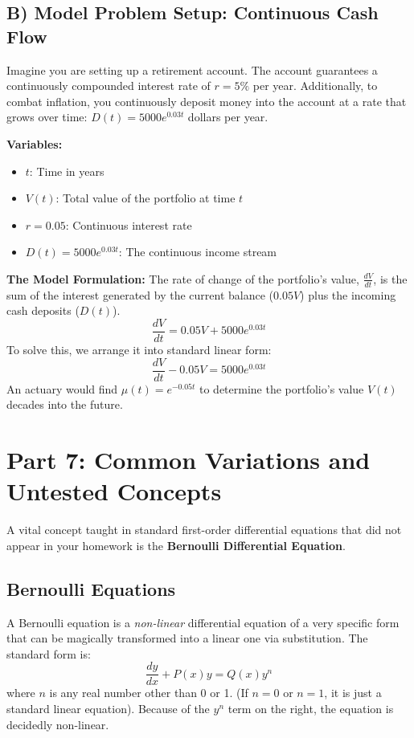\documentclass[11pt]{article}
\begin{document}
\subsection{B) Model Problem Setup: Continuous Cash Flow}
Imagine you are setting up a retirement account. The account guarantees a continuously compounded interest rate of $r = 5\%$ per year. Additionally, to combat inflation, you continuously deposit money into the account at a rate that grows over time: $D(t) = 5000e^{0.03t}$ dollars per year. 

\textbf{Variables:}
\begin{itemize}
    \item $t$: Time in years
    \item $V(t)$: Total value of the portfolio at time $t$
    \item $r = 0.05$: Continuous interest rate
    \item $D(t) = 5000e^{0.03t}$: The continuous income stream
\end{itemize}
\textbf{The Model Formulation:}
The rate of change of the portfolio's value, $\frac{dV}{dt}$, is the sum of the interest generated by the current balance ($0.05V$) plus the incoming cash deposits ($D(t)$).
\[ \frac{dV}{dt} = 0.05V + 5000e^{0.03t} \]
To solve this, we arrange it into standard linear form:
\[ \frac{dV}{dt} - 0.05V = 5000e^{0.03t} \]
An actuary would find $\mu(t) = e^{-0.05t}$ to determine the portfolio's value $V(t)$ decades into the future.

\newpage
\section{Part 7: Common Variations and Untested Concepts}

A vital concept taught in standard first-order differential equations that did not appear in your homework is the \textbf{Bernoulli Differential Equation}.

\subsection{Bernoulli Equations}
A Bernoulli equation is a \textit{non-linear} differential equation of a very specific form that can be magically transformed into a linear one via substitution. The standard form is:
\[ \frac{dy}{dx} + P(x)y = Q(x)y^n \]
where $n$ is any real number other than 0 or 1. (If $n=0$ or $n=1$, it is just a standard linear equation). Because of the $y^n$ term on the right, the equation is decidedly non-linear.
\end{document}
